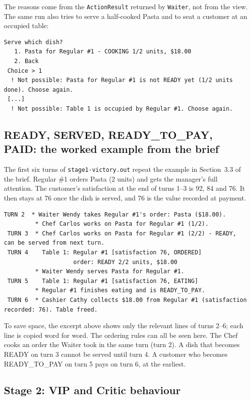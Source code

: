 The reasons come from the \texttt{ActionResult} returned by \texttt{Waiter}, not from the
view. The same run also tries to serve a half-cooked Pasta and to seat a customer at an
occupied table:

\begin{lstlisting}[style=run]
 Serve which dish?
   1. Pasta for Regular #1 - COOKING 1/2 units, $18.00
   2. Back
 Choice > 1
  ! Not possible: Pasta for Regular #1 is not READY yet (1/2 units done). Choose again.
 [...]
  ! Not possible: Table 1 is occupied by Regular #1. Choose again.
\end{lstlisting}

\subsection{READY, SERVED, READY\_TO\_PAY, PAID: the worked example from the brief}

The first six turns of \texttt{stage1-victory.out} repeat the example in Section~3.3 of
the brief. Regular \#1 orders Pasta (2 units) and gets the manager's full attention. The
customer's satisfaction at the end of turns 1--3 is 92, 84 and 76. It then stays at 76
once the dish is served, and 76 is the value recorded at payment.

\begin{lstlisting}[style=run]
 TURN 2  * Waiter Wendy takes Regular #1's order: Pasta ($18.00).
         * Chef Carlos works on Pasta for Regular #1 (1/2).
 TURN 3  * Chef Carlos works on Pasta for Regular #1 (2/2) - READY, can be served from next turn.
 TURN 4    Table 1: Regular #1 [satisfaction 76, ORDERED]
                    order: READY 2/2 units, $18.00
         * Waiter Wendy serves Pasta for Regular #1.
 TURN 5    Table 1: Regular #1 [satisfaction 76, EATING]
         * Regular #1 finishes eating and is READY_TO_PAY.
 TURN 6  * Cashier Cathy collects $18.00 from Regular #1 (satisfaction recorded: 76). Table freed.
\end{lstlisting}

To save space, the excerpt above shows only the relevant lines of turns 2--6; each
line is copied word for word. The ordering rules can all be seen here. The Chef cooks an
order the Waiter took in the same turn (turn 2). A dish that becomes READY on turn 3
cannot be served until turn 4. A customer who becomes READY\_TO\_PAY on turn 5 pays on
turn 6, at the earliest.

\subsection{Stage 2: VIP and Critic behaviour}

